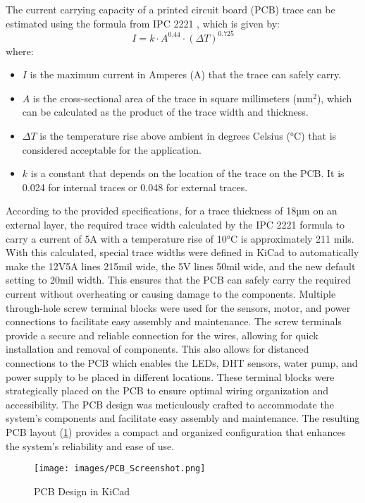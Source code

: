 \documentclass[12pt]{article}
\begin{document}
\newline
\newline
\noindent The current carrying capacity of a printed circuit board (PCB) trace can be estimated using the formula from IPC 2221 \cite{ref_ipc_2221}, which is given by:
\begin{equation}
    I = k \cdot A^{0.44} \cdot (\Delta T)^{0.725}
\end{equation}
where:
\begin{itemize}
    \item \(I\) is the maximum current in Amperes (A) that the trace can safely carry.
    \item \(A\) is the cross-sectional area of the trace in square millimeters (mm\(^2\)), which can be calculated as the product of the trace width and thickness.
    \item \(\Delta T\) is the temperature rise above ambient in degrees Celsius (°C) that is considered acceptable for the application.
    \item \(k\) is a constant that depends on the location of the trace on the PCB. It is 0.024 for internal traces or 0.048 for external traces.
\end{itemize}

\noindent According to the provided specifications, for a trace thickness of 18µm on an external layer, the required trace width calculated by the IPC 2221 formula to carry a current of 5A with a temperature rise of 10°C is approximately 211 mils. With this calculated, special trace widths were defined in KiCad to automatically make the 12V5A lines 215mil wide, the 5V lines 50mil wide, and the new default setting to 20mil width. This ensures that the PCB can safely carry the required current without overheating or causing damage to the components.
\newline
\newline
\noindent Multiple through-hole screw terminal blocks were used for the sensors, motor, and power connections to facilitate easy assembly and maintenance. The screw terminals provide a secure and reliable connection for the wires, allowing for quick installation and removal of components. This also allows for distanced connections to the PCB which enables the LEDs, DHT sensors, water pump, and power supply to be placed in different locations. These terminal blocks were strategically placed on the PCB to ensure optimal wiring organization and accessibility. The PCB design was meticulously crafted to accommodate the system's components and facilitate easy assembly and maintenance. The resulting PCB layout (\ref{fig:PCB_DESIGN}) provides a compact and organized configuration that enhances the system's reliability and ease of use.
\begin{figure}[H]
    \centering
    \texttt{[image: images/PCB\_Screenshot.png]}
    \caption{PCB Design in KiCad}
    \label{fig:PCB_DESIGN}
\end{figure}
\end{document}

